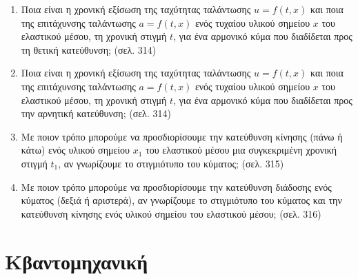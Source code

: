 \documentclass{article}
\begin{document}
\begin{enumerate}
      \item Ποια είναι η χρονική εξίσωση της ταχύτητας ταλάντωσης $u = f(t,x)$ και ποια της επιτάχυνσης ταλάντωσης $a = f(t,x)$ ενός τυχαίου υλικού σημείου $x$ του ελαστικού μέσου, τη χρονική στιγμή $t$, για ένα αρμονικό κύμα που διαδίδεται προς τη θετική κατεύθυνση; (σελ. 314)

      \item Ποια είναι η χρονική εξίσωση της ταχύτητας ταλάντωσης $u = f(t,x)$ και ποια της επιτάχυνσης ταλάντωσης $a = f(t,x)$ ενός τυχαίου υλικού σημείου $x$ του ελαστικού μέσου, τη χρονική στιγμή $t$, για ένα αρμονικό κύμα που διαδίδεται προς την αρνητική κατεύθυνση; (σελ. 314)

      \item Με ποιον τρόπο μπορούμε να προσδιορίσουμε την κατεύθυνση κίνησης (πάνω ή κάτω) ενός υλικού σημείου $x_1$ του ελαστικού μέσου μια συγκεκριμένη χρονική στιγμή $t_1$, αν γνωρίζουμε το στιγμιότυπο του κύματος; (σελ. 315)

      \item Με ποιον τρόπο μπορούμε να προσδιορίσουμε την κατεύθυνση διάδοσης ενός κύματος (δεξιά ή αριστερά), αν γνωρίζουμε το στιγμιότυπο του κύματος και την κατεύθυνση κίνησης ενός υλικού σημείου του ελαστικού μέσου; (σελ. 316)
\end{enumerate}

\section{Κβαντομηχανική}
\end{document}
